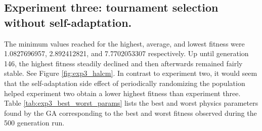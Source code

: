 

\newpage

\subsection[Experiment Three]{Experiment three: tournament selection without self-adaptation.}

The minimum values reached for the highest, average, and lowest fitness were 1.0827696957, 2.892412821, and 7.7702053307 respectively. Up until generation 146, the highest fitness steadily declined and then afterwards remained fairly stable. See Figure \ref{fig:exp3_halcm}. In contrast to experiment two, it would seem that the self-adaptation side effect of periodically randomizing the population helped experiment two obtain a lower highest fitness than experiment three. Table \ref{tab:exp3_best_worst_params} lists the best and worst physics parameters found by the GA corresponding to the best and worst fitness observed during the 500 generation run.

